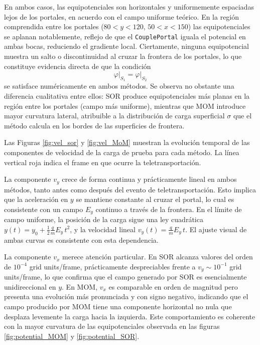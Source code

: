 \documentclass[12pt, twocolumn]{article}
\begin{document}
En ambos casos, las equipotenciales son horizontales y uniformemente espaciadas lejos de los portales, en acuerdo con el campo uniforme teórico. En la región comprendida entre los portales ($80 < y < 120$, $50 < x < 150$) las equipotenciales se aplanan notablemente, reflejo de que el \texttt{CouplePortal} iguala el potencial en ambas bocas, reduciendo el gradiente local. Ciertamente, ninguna equipotencial muestra un salto o discontinuidad al cruzar la frontera de los portales, lo que constituye evidencia directa de que
la condición
\begin{equation}
    \varphi\big|_{S_1} = \varphi\big|_{S_2}
\end{equation}
se satisface numéricamente en ambos métodos. Se observa no obstante una
diferencia cualitativa entre ellos: SOR produce equipotenciales más planas en la
región entre los portales (campo más uniforme), mientras que MOM introduce
mayor curvatura lateral, atribuible a la distribución de carga superficial
$\sigma$ que el método calcula en los bordes de las superficies de frontera.

Las Figuras \ref{fig:vel_sor} y \ref{fig:vel_MoM} muestran la evolución temporal de las componentes de velocidad de la carga de prueba para cada método. La línea vertical roja indica el frame en que ocurre la teletransportación.

La componente $v_y$ crece de forma continua y prácticamente lineal en ambos métodos, tanto antes como después del evento de teletransportación. Esto implica que la aceleración en $y$ se mantiene constante al cruzar el portal, lo cual es consistente con un campo $E_y$ continuo a través de la frontera. En el límite de campo uniforme, la posición de la carga sigue una ley cuadrática $y(t) = y_0 + \frac{1}{2}\frac{q}{m}E_y\, t^2$, y la velocidad lineal $v_y(t) = \frac{q}{m}E_y\, t$. El ajuste visual de ambas curvas es consistente con esta dependencia.

La componente $v_x$ merece atención particular. En SOR alcanza valores del orden de $10^{-4}$ grid units/frame, prácticamente despreciables frente a $v_y \sim 10^{-1}$ grid units/frame, lo que confirma que el campo generado por SOR es esencialmente unidireccional en $y$. En MOM, $v_x$ es comparable en orden de magnitud pero presenta una evolución más pronunciada y con signo negativo, indicando que el campo producido por MOM tiene una componente horizontal no nula que desplaza levemente la carga hacia la izquierda. Este comportamiento es coherente con la mayor curvatura de las equipotenciales observada en las figuras \ref{fig:potential_MOM} y \ref{fig:potential_SOR}.
\end{document}
